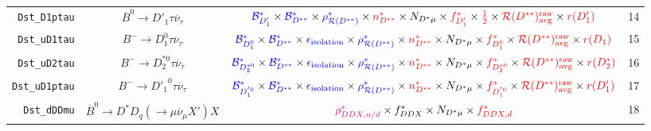 \begin{landscape}
\begin{table}
\begin{tabular}{r|c|c|l}
  \texttt{Dst\_D1ptau} &            $\overline{B}^0 \rightarrow D'_1 \tau \overline{\nu}_\tau$             &             $\textcolor{blue}{\mathcal{B}^{*}_{D'_1}} \times \textcolor{blue}{\mathcal{B}^*_{D^{**}}} \times \textcolor{blue}{\rho_{\mathcal{R}(D^{**})}^*} \times \textcolor{red}{n^{*}_{D^{**}}} \times N_{D^* \mu} \times \textcolor{red}{f^{*}_{D'_1}} \times \textcolor{red}{\frac{1}{2}} \times \textcolor{red}{\mathcal{R}(D^{**})_\text{avg}^\text{raw}} \times \textcolor{red}{r({D'_1})}$             &               14 \\
  \texttt{Dst\_uD1tau} &                 $B^- \rightarrow D_1^0 \tau \overline{\nu}_\tau$                  &     $\textcolor{blue}{\mathcal{B}^{*}_{D_1^0}} \times \textcolor{blue}{\mathcal{B}^*_{D^{**}}} \times \textcolor{blue}{\epsilon_\text{isolation}} \times \textcolor{blue}{\rho_{\mathcal{R}(D^{**})}^*} \times \textcolor{red}{n^{*}_{D^{**}}} \times N_{D^* \mu} \times \textcolor{red}{f^{*}_{D_1^0}} \times \textcolor{red}{\mathcal{R}(D^{**})_\text{avg}^\text{raw}} \times \textcolor{red}{r({D_1})}$     &               15 \\
  \texttt{Dst\_uD2tau} &                $B^- \rightarrow D_2^{*0} \tau \overline{\nu}_\tau$                & $\textcolor{blue}{\mathcal{B}^{*}_{D_2^{*0}}} \times \textcolor{blue}{\mathcal{B}^*_{D^{**}}} \times \textcolor{blue}{\epsilon_\text{isolation}} \times \textcolor{blue}{\rho_{\mathcal{R}(D^{**})}^*} \times \textcolor{red}{n^{*}_{D^{**}}} \times N_{D^* \mu} \times \textcolor{red}{f^{*}_{D_2^{*0}}} \times \textcolor{red}{\mathcal{R}(D^{**})_\text{avg}^\text{raw}} \times \textcolor{red}{r({D_2^*})}$ &               16 \\
 \texttt{Dst\_uD1ptau} &                $B^- \rightarrow {D'_1}^0 \tau \overline{\nu}_\tau$                & $\textcolor{blue}{\mathcal{B}^{*}_{D_1^{'0}}} \times \textcolor{blue}{\mathcal{B}^*_{D^{**}}} \times \textcolor{blue}{\epsilon_\text{isolation}} \times \textcolor{blue}{\rho_{\mathcal{R}(D^{**})}^*} \times \textcolor{red}{n^{*}_{D^{**}}} \times N_{D^* \mu} \times \textcolor{red}{f^{*}_{D_1^{'0}}} \times \textcolor{red}{\mathcal{R}(D^{**})_\text{avg}^\text{raw}} \times \textcolor{red}{r({D'_1})}$  &               17 \\
   \texttt{Dst\_dDDmu} &  $\overline{B}^0 \rightarrow D^* D_q (\rightarrow \mu \overline{\nu}_\mu X') X$   &                                                                                                                                                 $\textcolor{magenta}{\rho^*_{DDX,u/d}} \times f^*_{DDX} \times N_{D^* \mu} \times \textcolor{red}{f^*_{DDX,d}}$                                                                                                                                                 &               18 \\

\end{tabular}
\end{table}
\end{landscape}

